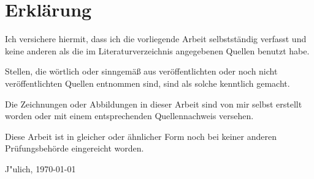 \clearpage
\chapter*{Erklärung}\label{erklaerung}
Ich versichere hiermit, dass ich die vorliegende Arbeit selbstständig verfasst und keine anderen als die im Literaturverzeichnis angegebenen Quellen benutzt habe.

\bigskip

Stellen, die wörtlich oder sinngemäß aus veröffentlichten oder noch nicht veröffentlichten Quellen entnommen sind, sind als solche kenntlich gemacht.

\bigskip

Die Zeichnungen oder Abbildungen in dieser Arbeit sind von mir selbst erstellt worden oder mit einem entsprechenden Quellennachweis versehen.

\bigskip

Diese Arbeit ist in gleicher oder ähnlicher Form noch bei keiner anderen Prüfungsbehörde eingereicht worden.

\vspace{1cm}
J"ulich, \today %

\vspace{7cm}



